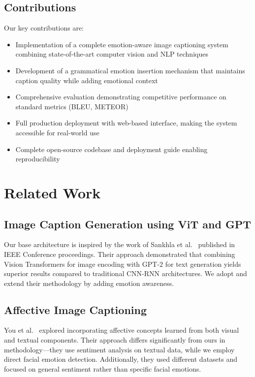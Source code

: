 \documentclass[12pt]{article}
\begin{document}
\subsection{Contributions}
Our key contributions are:
\begin{itemize}
\item Implementation of a complete emotion-aware image captioning system combining state-of-the-art computer vision and NLP techniques
\item Development of a grammatical emotion insertion mechanism that maintains caption quality while adding emotional context
\item Comprehensive evaluation demonstrating competitive performance on standard metrics (BLEU, METEOR)
\item Full production deployment with web-based interface, making the system accessible for real-world use
\item Complete open-source codebase and deployment guide enabling reproducibility
\end{itemize}

\section{Related Work}

\subsection{Image Caption Generation using ViT and GPT}
Our base architecture is inspired by the work of Sankhla et al.~\cite{sankhla2024} published in IEEE Conference proceedings. Their approach demonstrated that combining Vision Transformers for image encoding with GPT-2 for text generation yields superior results compared to traditional CNN-RNN architectures. We adopt and extend their methodology by adding emotion awareness.

\subsection{Affective Image Captioning}
You et al.~\cite{you2018} explored incorporating affective concepts learned from both visual and textual components. Their approach differs significantly from ours in methodology—they use sentiment analysis on textual data, while we employ direct facial emotion detection. Additionally, they used different datasets and focused on general sentiment rather than specific facial emotions.
\end{document}
